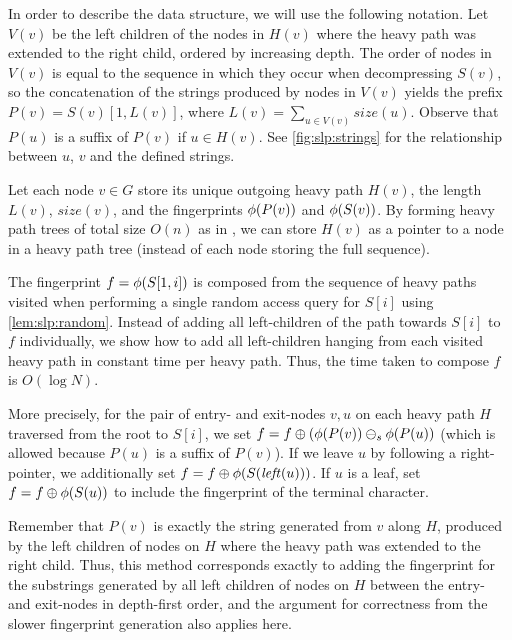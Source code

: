 \documentclass[11pt]{article}
\newcommand{\fp}{\ensuremath\phi}
\newcommand{\fpplus}{\ensuremath{\oplus}}
\newcommand{\fpdelsuffix}{\ensuremath{\ominus_s}}
\newcommand{\size}{\ensuremath{\mathit{size}}}
\newcommand{\heavypath}{\ensuremath{H}}
\newcommand{\lchild}{\ensuremath{\mathit{left}}}
\newcommand{\leftnodes}{\ensuremath{V}} \newcommand{\leftsize}{\ensuremath{L}} \newcommand{\leftstring}{\ensuremath{P}} \newcommand{\str}{\ensuremath{S} }
\newcommand{\slp}{\ensuremath{G} }
\begin{document}
In order to describe the data structure, we will use the following notation. Let $\leftnodes(v)$ be the left children of the nodes in $\heavypath(v)$ where the heavy path was extended to the right child, ordered by increasing depth. The order of nodes in $V(v)$ is equal to the sequence in which they occur when decompressing $S(v)$, so the concatenation of the strings produced by nodes in $V(v)$ yields the prefix $P(v)=S(v)[1,L(v)]$, where $\leftsize(v) = \sum_{u \in \leftnodes(v)} \size(u)$. Observe that $\leftstring(u)$ is a suffix of $\leftstring(v)$ if $u \in \heavypath(v)$. See \autoref{fig:slp:strings} for the relationship between $u$, $v$ and the defined strings.
 
Let each node $v \in \slp$ store its unique outgoing heavy path $\heavypath(v)$, the length $\leftsize(v)$, $\size(v)$, and the fingerprints $\fp(\leftstring(v))$ and $\fp(S(v))$. By forming heavy path trees of total size $O(n)$ as in \cite{bille2011random}, we can store $\heavypath(v)$ as a pointer to a node in a heavy path tree (instead of each node storing the full sequence).

The fingerprint $f = \fp(S[1, i])$ is composed from the sequence of heavy paths visited when performing a single random access query for $S[i]$ using \autoref{lem:slp:random}. Instead of adding all left-children of the path towards $S[i]$ to $f$ individually, we show how to add all left-children hanging from each visited heavy path in constant time per heavy path. Thus, the time taken to compose $f$ is $O(\log N)$. 

More precisely, for the pair of entry- and exit-nodes $v, u$ on each heavy path $H$ traversed from the root to $S[i]$, we set $f = f \fpplus (\fp(\leftstring(v)) \fpdelsuffix \fp(\leftstring(u))$ (which is allowed because $\leftstring(u)$ is a suffix of $\leftstring(v)$). If we leave $u$ by following a right-pointer, we additionally set $f = f \fpplus \fp(S(\lchild(u)))$. If $u$ is a leaf, set $f = f \fpplus \fp(S(u))$ to include the fingerprint of the terminal character. 

Remember that $\leftstring(v)$ is exactly the string generated from $v$ along $H$, produced by the left children of nodes on $H$ where the heavy path was extended to the right child. Thus, this method corresponds exactly to adding the fingerprint for the substrings generated by all left children of nodes on $H$ between the entry- and exit-nodes in depth-first order, and the argument for correctness from the slower fingerprint generation also applies here.
\end{document}
